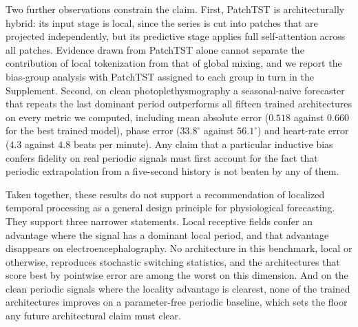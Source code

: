 Two further observations constrain the claim. First, PatchTST is architecturally hybrid: its
input stage is local, since the series is cut into patches that are projected independently, but
its predictive stage applies full self-attention across all patches. Evidence drawn from PatchTST
alone cannot separate the contribution of local tokenization from that of global mixing, and we
report the bias-group analysis with PatchTST assigned to each group in turn in the Supplement.
Second, on clean photoplethysmography a seasonal-naive forecaster that repeats the last dominant
period outperforms all fifteen trained architectures on every metric we computed, including mean
absolute error ($0.518$ against $0.660$ for the best trained model), phase error
($33.8^{\circ}$ against $56.1^{\circ}$) and heart-rate error ($4.3$ against $4.8$ beats per
minute). Any claim that a particular inductive bias confers fidelity on real periodic signals
must first account for the fact that periodic extrapolation from a five-second history is not
beaten by any of them.

Taken together, these results do not support a recommendation of localized temporal processing as
a general design principle for physiological forecasting. They support three narrower statements.
Local receptive fields confer an advantage where the signal has a dominant local period, and that
advantage disappears on electroencephalography. No architecture in this benchmark, local or
otherwise, reproduces stochastic switching statistics, and the architectures that score best by
pointwise error are among the worst on this dimension. And on the clean periodic signals where
the locality advantage is clearest, none of the trained architectures improves on a
parameter-free periodic baseline, which sets the floor any future architectural claim must clear.
